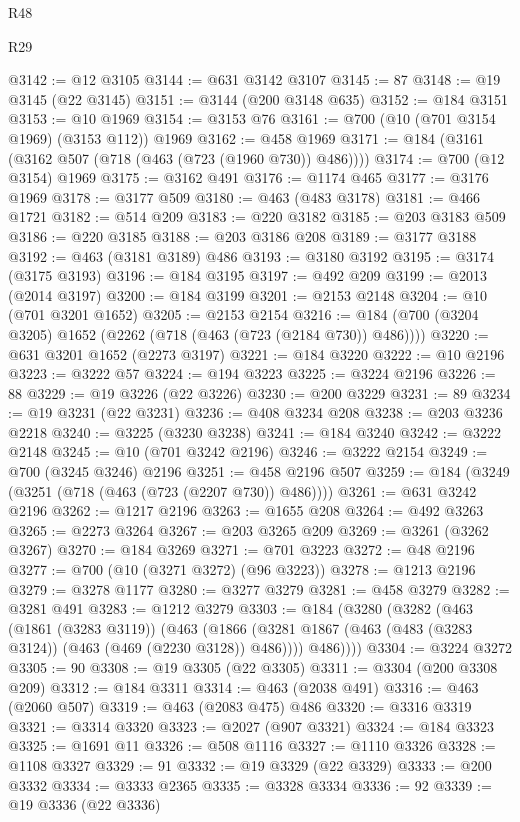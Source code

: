 \begin{lexlean}{R48}
\begin{lexlean}{R29}
\begin{coremodule}
{{{{{{{{{{{{{{{{{{{{{{{{{{{{{{{{{{{{{{{{{{{{{{{{{{{{{{{{{{{{{{{{{{{{{{{{{{{{{{{{{{{{{{{{{{{{{{{{{{{{{{{{{{{{{{{{{{{{{{{{{{{{{{{{{{{{{{{{{{{{{{{{{{{{{{{{{{{{{{{{{{{{{{{{{{{{{{{{{{{{{{{{{{{{{{{{{{{{{{{{{{{{{{{{{{{{{{{{{{@3142 := @12 @3105
@3144 := @631 @3142 @3107
@3145 := 87
@3148 := @19 @3145 (@22 @3145)
@3151 := @3144 (@200 @3148 @635)
@3152 := @184 @3151
@3153 := @10 @1969
@3154 := @3153 @76
@3161 := @700 (@10 (@701 @3154 @1969) (@3153 @112)) @1969
@3162 := @458 @1969
@3171 := @184 (@3161 (@3162 @507 (@718 (@463 (@723 (@1960 @730)) @486))))
@3174 := @700 (@12 @3154) @1969
@3175 := @3162 @491
@3176 := @1174 @465
@3177 := @3176 @1969
@3178 := @3177 @509
@3180 := @463 (@483 @3178)
@3181 := @466 @1721
@3182 := @514 @209
@3183 := @220 @3182
@3185 := @203 @3183 @509
@3186 := @220 @3185
@3188 := @203 @3186 @208
@3189 := @3177 @3188
@3192 := @463 (@3181 @3189) @486
@3193 := @3180 @3192
@3195 := @3174 (@3175 @3193)
@3196 := @184 @3195
@3197 := @492 @209
@3199 := @2013 (@2014 @3197)
@3200 := @184 @3199
@3201 := @2153 @2148
@3204 := @10 (@701 @3201 @1652)
@3205 := @2153 @2154
@3216 := @184 (@700 (@3204 @3205) @1652 (@2262 (@718 (@463 (@723 (@2184 @730)) @486))))
@3220 := @631 @3201 @1652 (@2273 @3197)
@3221 := @184 @3220
@3222 := @10 @2196
@3223 := @3222 @57
@3224 := @194 @3223
@3225 := @3224 @2196
@3226 := 88
@3229 := @19 @3226 (@22 @3226)
@3230 := @200 @3229
@3231 := 89
@3234 := @19 @3231 (@22 @3231)
@3236 := @408 @3234 @208
@3238 := @203 @3236 @2218
@3240 := @3225 (@3230 @3238)
@3241 := @184 @3240
@3242 := @3222 @2148
@3245 := @10 (@701 @3242 @2196)
@3246 := @3222 @2154
@3249 := @700 (@3245 @3246) @2196
@3251 := @458 @2196 @507
@3259 := @184 (@3249 (@3251 (@718 (@463 (@723 (@2207 @730)) @486))))
@3261 := @631 @3242 @2196
@3262 := @1217 @2196
@3263 := @1655 @208
@3264 := @492 @3263
@3265 := @2273 @3264
@3267 := @203 @3265 @209
@3269 := @3261 (@3262 @3267)
@3270 := @184 @3269
@3271 := @701 @3223
@3272 := @48 @2196
@3277 := @700 (@10 (@3271 @3272) (@96 @3223))
@3278 := @1213 @2196
@3279 := @3278 @1177
@3280 := @3277 @3279
@3281 := @458 @3279
@3282 := @3281 @491
@3283 := @1212 @3279
@3303 := @184
    (@3280
      (@3282
        (@463
          (@1861 (@3283 @3119))
          (@463
            (@1866 (@3281 @1867 (@463 (@483 (@3283 @3124)) (@463 (@469 (@2230 @3128)) @486))))
            @486))))
@3304 := @3224 @3272
@3305 := 90
@3308 := @19 @3305 (@22 @3305)
@3311 := @3304 (@200 @3308 @209)
@3312 := @184 @3311
@3314 := @463 (@2038 @491)
@3316 := @463 (@2060 @507)
@3319 := @463 (@2083 @475) @486
@3320 := @3316 @3319
@3321 := @3314 @3320
@3323 := @2027 (@907 @3321)
@3324 := @184 @3323
@3325 := @1691 @11
@3326 := @508 @1116
@3327 := @1110 @3326
@3328 := @1108 @3327
@3329 := 91
@3332 := @19 @3329 (@22 @3329)
@3333 := @200 @3332
@3334 := @3333 @2365
@3335 := @3328 @3334
@3336 := 92
@3339 := @19 @3336 (@22 @3336)
}}}}}}}}}}}}}}}}}}}}}}}}}}}}}}}}}}}}}}}}}}}}}}}}}}}}}}}}}}}}}}}}}}}}}}}}}}}}}}}}}}}}}}}}}}}}}}}}}}}}}}}}}}}}}}}}}}}}}}}}}}}}}}}}}}}}}}}}}}}}}}}}}}}}}}}}}}}}}}}}}}}}}}}}}}}}}}}}}}}}}}}}}}}}}}}}}}}}}}}}}}}}}}}}}}}}}}}}}}
\end{coremodule}
\end{lexlean}
\end{lexlean}
